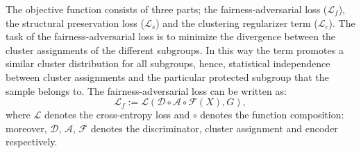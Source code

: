 
The objective function consists of three parts; the fairness-adversarial loss ($\mathcal{L}_f$), the structural preservation loss ($\mathcal{L}_{s}$) and the clustering regularizer term ($\mathcal{L}_c$). 
 The task of the fairness-adversarial loss is to minimize the divergence between the cluster assignments of the different subgroups. In this way the term promotes a similar cluster distribution for all subgroups, hence, statistical independence between cluster assignments and the particular protected subgroup that the sample belongs to. The fairness-adversarial loss can be written as:
 \begin{equation}
    \mathcal{L}_f := \mathcal{L}(\mathcal{D}\circ\mathcal{A}\circ\mathcal{F}(X), G),
    \label{eq:loss_f}
\end{equation}
where $\mathcal{L}$ denotes the cross-entropy loss and $\circ$ denotes the function composition: moreover, $\mathcal{D}$, $\mathcal{A}$, $\mathcal{F}$ denotes the discriminator, cluster assignment and encoder respectively.

